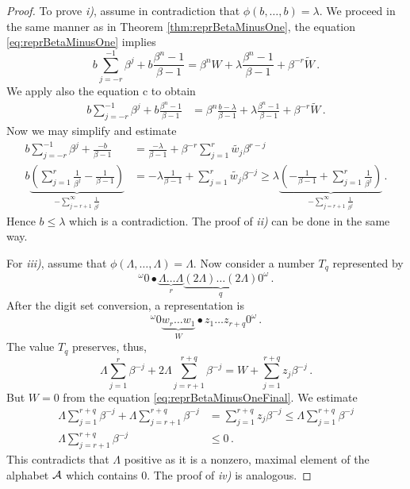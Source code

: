 \begin{proof}
To prove \textit{i)}, assume in contradiction that $\phi(b,\dots,b)= \lambda$. We proceed in the same manner as in Theorem \ref{thm:reprBetaMinusOne}, the equation \eqref{eq:reprBetaMinusOne} implies
$$
b \sum_{j=-r}^{-1} \beta^j +b\frac{\beta^n-1}{\beta-1} =  \beta^n W + \lambda \frac{\beta^n-1}{\beta-1} + \beta^{-r}\widetilde{W}\,.
$$
We apply also the equation c to obtain
\begin{align*}
b \sum_{j=-r}^{-1} \beta^j +b\frac{\beta^n-1}{\beta-1} &=  \beta^n \frac{b-\lambda}{\beta-1} + \lambda \frac{\beta^n-1}{\beta-1} + \beta^{-r}\widetilde{W}\,.
\end{align*}
Now we may simplify and estimate
\begin{align*}
b \sum_{j=-r}^{-1} \beta^j +\frac{-b}{\beta-1} &=  \frac{-\lambda}{\beta-1} + \beta^{-r}\sum_{j=1}^r\widetilde{w_j} \beta^{r-j} \\
b \underbrace{\left(\sum_{j=1}^{r} \frac{1}{\beta^j} -\frac{1}{\beta-1}\right)}_{-\sum_{j=r+1}^{\infty} \frac{1}{\beta^j}} &=  -\lambda\frac{1}{\beta-1} + \sum_{j=1}^r\widetilde{w_j} \beta^{-j}\geq  \lambda\underbrace{\left(-\frac{1}{\beta-1}+\sum_{j=1}^{r} \frac{1}{\beta^j} \right)}_{-\sum_{j=r+1}^{\infty}\frac{1}{\beta^j}}\,.
\end{align*}
Hence $b\leq\lambda$ which is a contradiction. The proof of \textit{ii)} can be done in the same way.

For \textit{iii)}, assume that $\phi(\Lambda,\dots,\Lambda)= \Lambda$. Now consider a number $T_q$ represented by
$$
^{\omega}\!0 \bullet \underbrace{\Lambda\dots\Lambda}_{r} \underbrace{(2\Lambda)\dots(2\Lambda)}_{q} 0^\omega\,.
$$
After the digit set conversion, a representation is
$$
^{\omega}\!0  \underbrace{w_r\dots w_1}_{W} \bullet z_1\dots z_{r+q} 0^\omega\,.
$$
The value $T_q$  preserves, thus,
$$
\Lambda\sum_{j=1}^r \beta^{-j} +2\Lambda \sum_{j=r+1}^{r+q} \beta^{-j}=W+\sum_{j=1}^{r+q}z_j\beta^{-j}\,.
$$
But $W=0$ from the equation \eqref{eq:reprBetaMinusOneFinal}. We estimate
\begin{align*}
\Lambda\sum_{j=1}^{r+q} \beta^{-j} +\Lambda \sum_{j=r+1}^{r+q} \beta^{-j}&=\sum_{j=1}^{r+q}z_j\beta^{-j}\leq \Lambda\sum_{j=1}^{r+q}\beta^{-j}\\
\Lambda \sum_{j=r+1}^{r+q} \beta^{-j}&\leq 0\,.
\end{align*}
This contradicts that $\Lambda$ positive as it is a nonzero, maximal element of the alphabet $\mathcal{A}$ which contains 0. The proof of \textit{iv)} is analogous.
\end{proof}



